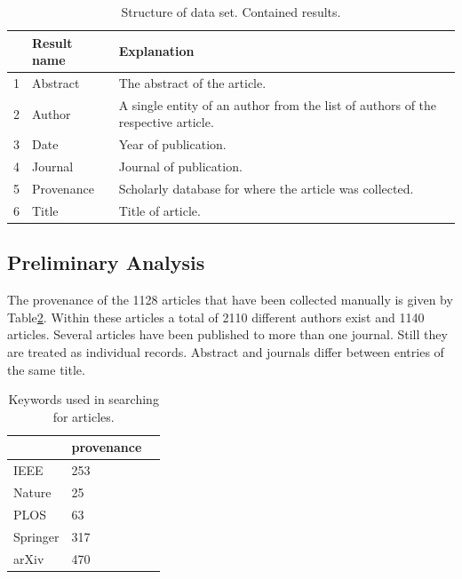 \documentclass{article}
\begin{document}
\begin{table}[!hbtp]
    \begin{center}
        \begin{tabular}{lll}
            \toprule
             & Result name & Explanation \\
             \midrule
             1 & Abstract & The abstract of the article.\\ 
             2 & Author & A single entity of an author from the list of 
             authors of the respective article.\\ 
             3 & Date & Year of publication.\\ 
             4 & Journal & Journal of publication.\\               
             5 & Provenance & Scholarly database for where the article was 
             collected.\\                        
             6 & Title & Title of article.\\               
            \bottomrule
        \end{tabular}
    \end{center}
    \caption{Structure of data set. Contained results.}
    \label{table:result_set}
\end{table}

\subsection{Preliminary Analysis}

The provenance of the 1128 articles that have been collected manually is given 
by Table\ref{table:provenance}. Within these articles a total of 2110 different
authors exist and 1140 articles. Several articles have been published to more 
than one journal. Still they are treated as individual records. Abstract and 
journals differ between entries of the same title. 

\begin{table}[!hbtp]
    \begin{center}
        \begin{tabular}{lll}
            \toprule
             & provenance \\
            \midrule
             IEEE &  253 \\
             Nature & 25 \\  
             PLOS & 63 \\
             Springer & 317 \\
             arXiv & 470 \\
            \bottomrule
        \end{tabular}
    \end{center}
    \caption{Keywords used in searching for articles.}
    \label{table:provenance}
\end{table}
\end{document}
